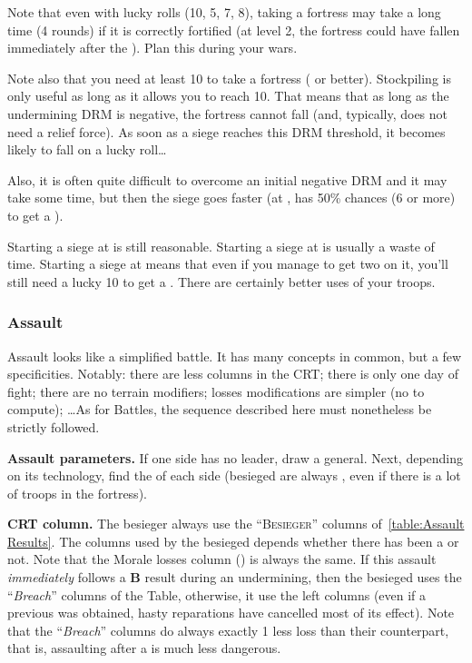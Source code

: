 \begin{playtip}
  Note that even with lucky rolls (10, 5, 7, 8), taking a fortress may take a
  long time (4 rounds) if it is correctly fortified (at level 2, the fortress
  could have fallen immediately after the ). Plan this during
  your wars.

  Note also that you need at least 10 to take a fortress ( or
  better). Stockpiling \USURE is only useful as long as it allows you to reach
  10. That means that as long as the undermining DRM is negative, the fortress
  cannot fall (and, typically, does not need a relief force). As soon as a
  siege reaches this  DRM threshold, it becomes likely to fall on a
  lucky roll\ldots

  Also, it is often quite difficult to overcome an initial negative DRM and it
  may take some time, but then the siege goes faster (at , \FRA has
  50\% chances (6 or more) to get a ).

  Starting a siege at  is still reasonable. Starting a siege at
   is usually a waste of time. Starting a siege at  means
  that even if you manage to get two \USURE\faceplus on it, you'll still need
  a lucky 10 to get a . There are certainly better uses of your
  troops.
\end{playtip}

\subsubsection{Assault}
Assault looks like a simplified battle. It has many concepts in common, but a
few specificities. Notably: there are less columns in the CRT; there is only
one day of fight; there are no terrain modifiers; losses modifications are
simpler (no  to compute); \ldots As for Battles, the
sequence described here must nonetheless be strictly followed.


\textbf{Assault parameters.} If one side has no leader, draw a
 general. Next, depending on its technology, find the
 of each side (besieged are always , even if
there is a lot of  troops in the fortress).

\textbf{CRT column.} The besieger always use the ``\textsc{Besieger}'' columns
of~\ref{table:Assault Results}. The columns used by the besieged depends
whether there has been a  or not. Note that the Morale losses
column (\textetoile) is always the same. If this assault \emph{immediately}
follows a \textbf{B} result during an undermining, then the besieged uses the
``\emph{Breach}'' columns of the Table, otherwise, it use the left
columns (even if a previous  was obtained, hasty reparations
have cancelled most of its effect). Note that the ``\emph{Breach}'' columns do
always exactly 1 less loss than their counterpart, that is, assaulting after a
 is much less dangerous.

